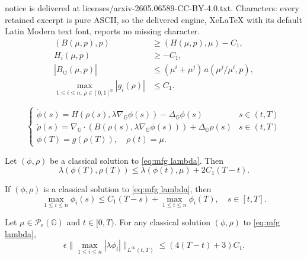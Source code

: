 \documentclass[10pt,a4paper]{amsart}
\def\G{\mathbb{G}}
\newcommand{\cP}{ \mathcal{P}}
\begin{document}
notice is delivered at licenses/arxiv-2605.06589-CC-BY-4.0.txt. Characters: every retained excerpt is pure ASCII, so the delivered engine, XeLaTeX with its default Latin Modern text font, reports no missing character.
\begin{align}
 (B(\mu,p),p)&\geq (H(\mu,p),\mu)-C_1, \label{as:B coercivity}\\
 H_i(\mu,p)&\geq -C_1, \label{as:H lower bound}\\
 |B_{ij}(\mu,p)|&\leq (\mu^i+\mu^j)\,a(\mu^j/\mu^i,p), \label{eq:mobility-dominated flux}\\
 \max_{1\leq i\leq n,\,\rho\in[0,1]^n}|g_i(\rho)|&\leq C_1. \label{as:g mu}
\end{align}

\begin{equation}  \label{eq:mfg lambda}
    \begin{cases} \dot \phi(s)= H(\rho(s),\lambda\nabla_{\G}\phi(s))-\Delta_{\G}\phi(s)& s\in (t,T)\\
    \dot \rho(s)=\nabla_{\G}\cdot (B(\rho(s),\lambda\nabla_{\G}\phi(s)))+\Delta_{\G}\rho(s)& s\in (t,T)\\
    \phi(T)= g(\rho(T)), \quad \rho(t)=\mu.
    \end{cases}
\end{equation}

\begin{lemma} \label{lem:lasrylions} Let $(\phi,\rho)$ be a classical solution to \eqref{eq:mfg lambda}. Then
\begin{equation}
\lambda ( \phi(T),\rho(T))\leq \lambda ( \phi(t),\mu)+2C_1(T-t).
\end{equation}
\end{lemma}

\begin{lemma} \label{lem:upper phi} If $(\phi,\rho)$ is a classical solution to \eqref{eq:mfg lambda}, then
    \begin{equation}
        \max_{1\leq i \leq n} \phi_i(s) \leq  C_1(T-s)+\max_{1\leq i\leq n}  \phi_i(T), \quad s\in [t, T].
    \end{equation}
\end{lemma}

\begin{proposition}\label{prop:phi bd} Let $\mu \in \cP_\epsilon(\G)$ and $t\in[0,T)$. For any classical solution $(\phi,\rho)$ to \eqref{eq:mfg lambda},
\begin{equation}
\epsilon \big\|\max_{1\leq i\leq n}| \lambda\phi_i|\big\|_{L^{\infty}(t,T)}\leq (4(T-t)+3)C_1.
\end{equation}
\end{proposition}
\end{document}
